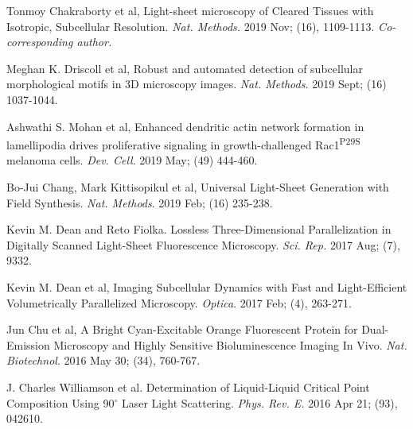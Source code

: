\begin{etaremune}
\item Tonmoy Chakraborty et al, Light-sheet microscopy of Cleared Tissues with Isotropic, Subcellular Resolution. {\it Nat. Methods.} 2019 Nov; (16), 1109-1113.  {\it Co-corresponding author.}

\item Meghan K. Driscoll et al, Robust and automated detection of subcellular morphological motifs in 3D microscopy images. {\it Nat. Methods.} 2019 Sept; (16) 1037-1044.  

\item Ashwathi S. Mohan et al, Enhanced dendritic actin network formation in lamellipodia drives proliferative signaling in growth-challenged Rac1\textsuperscript{P29S} melanoma cells.  
{\it Dev. Cell}.  2019 May; (49) 444-460.

\item Bo-Jui Chang, Mark Kittisopikul et al, Universal Light-Sheet Generation with Field Synthesis. {\it Nat. Methods}. 2019  Feb; (16) 235-238. 

\item Kevin M. Dean and Reto Fiolka.  Lossless Three-Dimensional Parallelization in Digitally Scanned Light-Sheet Fluorescence Microscopy.  {\it Sci. Rep.} 2017 Aug; (7), 9332.  

\item Kevin M. Dean et al, Imaging Subcellular Dynamics with Fast and Light-Efficient Volumetrically Parallelized Microscopy. {\it Optica}.  2017 Feb; (4), 263-271.

\item Jun Chu et al,  A Bright Cyan-Excitable Orange Fluorescent Protein for Dual-Emission Microscopy and Highly Sensitive Bioluminescence Imaging In Vivo.  {\it Nat. Biotechnol}. 2016 May 30; (34), 760-767.

\item J. Charles Williamson et al.  Determination of Liquid-Liquid Critical Point Composition Using 90$^{\circ}$ Laser Light Scattering. {\it Phys. Rev. E.}  2016 Apr 21; (93), 042610.


\end{etaremune}
